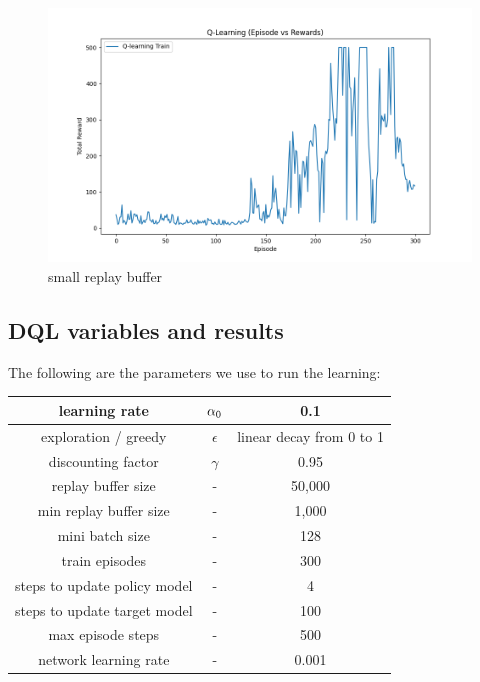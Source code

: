 \documentclass{article}
\begin{document}
\begin{figure}
  \includegraphics[width=\linewidth]{DQN-0002.png}
  \caption{small replay buffer}
  \label{fig:dqn-2}
\end{figure}

\subsection{DQL variables and results}

The following are the parameters we use to run the learning:

\begin{center}
\begin{tabular}{ |c|c|c| }
  \hline
  learning rate & $\alpha\textsubscript{0}$ & 0.1 \\
  \hline
  exploration / greedy & $\epsilon$ & linear decay from 0 to 1 \\
  \hline
  discounting factor & $\gamma$ & 0.95 \\  
  \hline
  replay buffer size & - & 50,000 \\
  \hline
  min replay buffer size & - & 1,000 \\
  \hline
  mini batch size & - & 128 \\
  \hline
  train episodes & - & 300 \\
  \hline
  steps to update policy model & - & 4 \\
  \hline
  steps to update target model & - & 100  \\
  \hline
  max episode steps & - & 500 \\
  \hline
  network learning rate & - & 0.001 \\
  \hline
\end{tabular}
\end{center}
\end{document}
